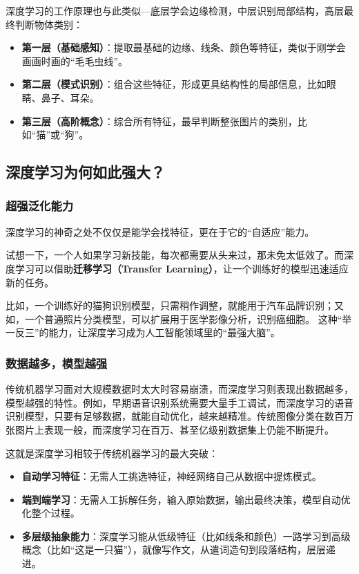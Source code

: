深度学习的工作原理也与此类似---底层学会边缘检测，中层识别局部结构，高层最终判断物体类别：
\begin{itemize}
    \item \textbf{第一层（基础感知）}：提取最基础的边缘、线条、颜色等特征，类似于刚学会画画时画的“毛毛虫线”。
    \item \textbf{第二层（模式识别）}：组合这些特征，形成更具结构性的局部信息，比如眼睛、鼻子、耳朵。
    \item \textbf{第三层（高阶概念）}：综合所有特征，最早判断整张图片的类别，比如“猫”或“狗”。
\end{itemize}


\subsection{深度学习为何如此强大？}
\subsubsection{ 超强泛化能力}
深度学习的神奇之处不仅仅是能学会找特征，更在于它的“自适应”能力。

试想一下，一个人如果学习新技能，每次都需要从头来过，那未免太低效了。而深度学习可以借助\textbf{迁移学习（Transfer Learning）}，让一个训练好的模型迅速适应新的任务。

比如，一个训练好的猫狗识别模型，只需稍作调整，就能用于汽车品牌识别；又如，一个普通照片分类模型，可以扩展用于医学影像分析，识别癌细胞。
这种“举一反三”的能力，让深度学习成为人工智能领域里的“最强大脑”。

\subsubsection{ 数据越多，模型越强}
传统机器学习面对大规模数据时太大时容易崩溃，而深度学习则表现出数据越多，模型越强的特性。例如，早期语音识别系统需要大量手工调试，而深度学习的语音识别模型，只要有足够数据，就能自动优化，越来越精准。传统图像分类在数百万张图片上表现一般，而深度学习在百万、甚至亿级别数据集上仍能不断提升。

这就是深度学习相较于传统机器学习的最大突破：
\begin{itemize}
\item \textbf{自动学习特征}：无需人工挑选特征，神经网络自己从数据中提炼模式。
\item \textbf{端到端学习}：无需人工拆解任务，输入原始数据，输出最终决策，模型自动优化整个过程。    
\item \textbf{多层级抽象能力}：深度学习能从低级特征（比如线条和颜色）一路学习到高级概念（比如“这是一只猫”），就像写作文，从遣词造句到段落结构，层层递进。
\end{itemize}

